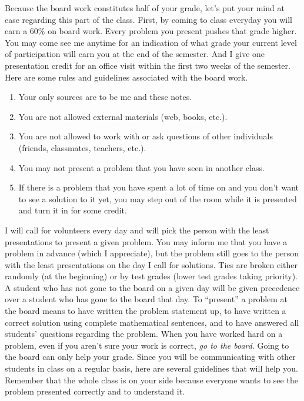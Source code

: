  Because the board work constitutes half of your grade, let's put your mind  at ease regarding this part of the class.  First, by coming to class everyday you will earn a 60\%  on board work.  Every problem you present pushes that grade higher.  You may come  see me anytime for an indication of what grade your current level of participation will  earn you at the end of the semester.  And I give one presentation credit for an office visit  within the first two weeks of the semester.  Here are some rules and  guidelines associated with the board work.
 \begin{enumerate}
 \item Your only sources are to be me and these notes.
 \item You are not allowed external materials (web, books, etc.).
 \item You are not allowed to work with or ask questions of other individuals (friends, classmates, teachers, etc.).
 \item You may not present a problem that you have seen in another class.
 \item If there is a problem that you have spent a lot of time on and you don't want to see a solution to it yet, you may
 step out of the room while it is presented and turn it in for some credit.
 \end{enumerate}
  I will call for volunteers every day and will pick the person with the least presentations to present a given problem.  You may inform me that you have a problem in advance (which I appreciate), but the problem still goes to the person with the least presentations on the day I call for solutions.  Ties are broken either randomly (at the beginning) or by test grades (lower test grades taking priority).  A student who has not gone to the board on a given day will be given precedence over a student who has gone to the board that day.  To ``present'' a problem at the board means to have written the problem statement up, to have written a correct solution using complete mathematical sentences, and to have answered all students' questions regarding the problem.  When you have worked hard on a problem, even if you aren't sure your work is correct, \emph{go to the board}.  Going to the board can only help your grade. Since you will be communicating  with other students in class on a regular basis, here are several guidelines that will help you. Remember that the whole class is on your side because everyone wants to see the problem presented correctly and to understand it.

